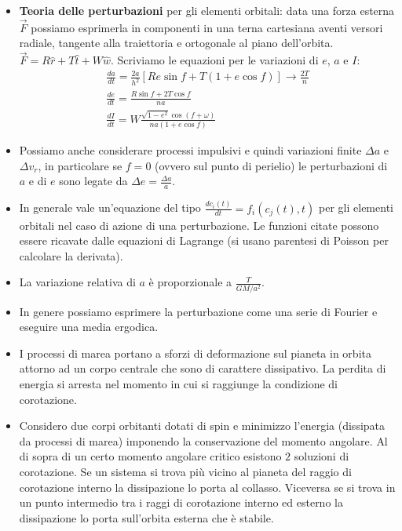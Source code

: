 \documentclass[11pt,a4paper]{article}
\begin{document}
\begin{itemize}
\item \textbf{Teoria delle perturbazioni} per gli elementi orbitali: data una forza esterna $\vec{F}$ possiamo esprimerla in componenti in una terna cartesiana aventi versori radiale, tangente alla traiettoria e ortogonale al piano dell'orbita. $\vec{F} = R \hat{r} + T \hat{t} + W \hat{w}$. Scriviamo le equazioni per le variazioni di $e$, $a$ e $I$:
\begin{gather}
\frac{d a}{d t} = \frac{2 a}{h^2} \left[ R e \sin f + T \left( 1 + e \cos f \right) \right] \rightarrow \frac{2 T}{n}\\
\frac{d e }{ d t} = \frac{R \sin f + 2 T \cos f}{n a} \\
\frac{d I}{d t} = W \frac{\sqrt{1 - e^2} \cos (f + \omega)}{n a ( 1 + e \cos f )}
\end{gather}

\item Possiamo anche considerare processi impulsivi e quindi variazioni finite $\Delta a$ e $\Delta v_{r}$, in particolare se $f = 0$ (ovvero sul punto di perielio) le perturbazioni di $a$ e di $e$ sono legate da $\Delta e = \frac{\Delta a}{a}$.

\item In generale vale un'equazione del tipo $\frac{d c_i(t)}{dt} = f_i \left( c_j(t), t \right)$ per gli elementi orbitali nel caso di azione di una perturbazione. Le funzioni citate possono essere ricavate dalle equazioni di Lagrange (si usano parentesi di Poisson per calcolare la derivata).

\item La variazione relativa di $a$ è proporzionale a $\frac{T}{GM/a^2}$.

\item In genere possiamo esprimere la perturbazione come una serie di Fourier e eseguire una media ergodica.

\item I processi di marea portano a sforzi di deformazione sul pianeta in orbita attorno ad un corpo centrale che sono di carattere dissipativo. La perdita di energia si arresta nel momento in cui si raggiunge la condizione di corotazione.

\item Considero due corpi orbitanti dotati di spin e minimizzo l'energia (dissipata da processi di marea) imponendo la conservazione del momento angolare. Al di sopra di un certo momento angolare critico esistono $2$ soluzioni di corotazione. Se un sistema si trova più vicino al pianeta del raggio di corotazione interno la dissipazione lo porta al collasso. Viceversa se si trova in un punto intermedio tra i raggi di corotazione interno ed esterno la dissipazione lo porta sull'orbita esterna che è stabile.


\end{itemize}
\end{document}
